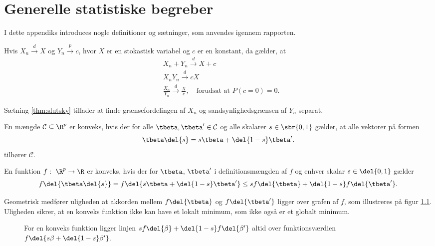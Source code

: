 \chapter{Generelle statistiske begreber}
I dette appendiks introduces nogle definitioner og sætninger, som anvendes igennem rapporten.
%
\begin{thm} \label{thm:slutsky}
Hvis $X_n \overset{d}{\rightarrow} X$ og $Y_n \overset{p}{\rightarrow} c$, hvor $X$ er en stokastisk variabel og $c$ er en konstant, da gælder, at
\begin{align*}
& X_n + Y_n \overset{d}{\rightarrow} X+c \\
& X_n Y_n \overset{d}{\rightarrow} cX \\
& \frac{X_n}{Y_n} \overset{d}{\rightarrow} \frac{X}{c}, \quad \text{forudsat at } P(c=0)=0.
\end{align*}
\end{thm}
Sætning \ref{thm:slutsky} tillader at finde grænsefordelingen af $X_n$ og sandsynlighedsgrænsen af $Y_n$ separat.
%
\begin{defn} \label{defn:konveksm}
En mængde \(\mathcal{C} \subseteq \R^p\) er konveks, hvis der for alle \(\tbeta, \tbeta' \in \mathcal{C}\) og alle skalarer \(s \in \sbr{0,1}\) gælder, at alle vektorer på formen
\begin{align*}
\tbeta \del{s} = s \tbeta + \del{1-s} \tbeta'.
\end{align*}
tilhører \(\mathcal{C}\).
\end{defn}
%
\begin{defn} \label{defn:konveksfkt}
En funktion \(f: \ \R^p \rightarrow \R\) er konveks, hvis der for \(\tbeta\), \(\tbeta'\) i definitionsmængden af \(f\) og enhver skalar \(s \in \del{0,1}\) gælder
\begin{align*}
f \del{\tbeta \del{s}} = f \del{s \tbeta + \del{1-s} \tbeta'} \leq s f\del{\tbeta} + \del{1-s} f\del{\tbeta'}.
\end{align*}
\end{defn}
Geometrisk medfører uligheden at akkorden mellem \(f \del{\tbeta}\) og  \(f \del{\tbeta'}\) ligger over grafen af \(f\), som illustreres på figur \ref{fig:konveks}.
Uligheden sikrer, at en konveks funktion ikke kan have et lokalt minimum, som ikke også er et globalt minimum.
%
\begin{figure}[H]
\centering
\scalebox{1.2}{}
\caption{For en konveks funktion ligger linjen \(s f \del{\beta} + \del{1-s} f \del{\beta'}\) altid over funktionsværdien \(f \del{s \beta + \del{1-s} \beta'}\).} \label{fig:konveks}
\end{figure}
